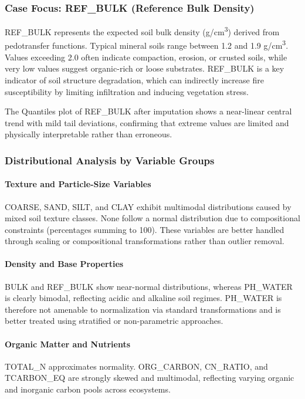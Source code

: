 \subsubsection*{Case Focus: REF\_BULK (Reference Bulk Density)}

REF\_BULK represents the expected soil bulk density (g/cm\textsuperscript{3}) derived from pedotransfer functions. Typical mineral soils range between 1.2 and 1.9 g/cm\textsuperscript{3}. Values exceeding 2.0 often indicate compaction, erosion, or crusted soils, while very low values suggest organic-rich or loose substrates. REF\_BULK is a key indicator of soil structure degradation, which can indirectly increase fire susceptibility by limiting infiltration and inducing vegetation stress\cite{nrcs_bulk_density}.

The Quantiles plot of REF\_BULK after imputation shows a near-linear central trend with mild tail deviations, confirming that extreme values are limited and physically interpretable rather than erroneous.

\subsubsection*{Distributional Analysis by Variable Groups}

\paragraph{Texture and Particle-Size Variables}
COARSE, SAND, SILT, and CLAY exhibit multimodal distributions caused by mixed soil texture classes. None follow a normal distribution due to compositional constraints (percentages summing to 100). These variables are better handled through scaling or compositional transformations rather than outlier removal.

\paragraph{Density and Base Properties}
BULK and REF\_BULK show near-normal distributions, whereas PH\_WATER is clearly bimodal, reflecting acidic and alkaline soil regimes. PH\_WATER is therefore not amenable to normalization via standard transformations and is better treated using stratified or non-parametric approaches.

\paragraph{Organic Matter and Nutrients}
TOTAL\_N approximates normality. ORG\_CARBON, CN\_RATIO, and TCARBON\_EQ are strongly skewed and multimodal, reflecting varying organic and inorganic carbon pools across ecosystems.

